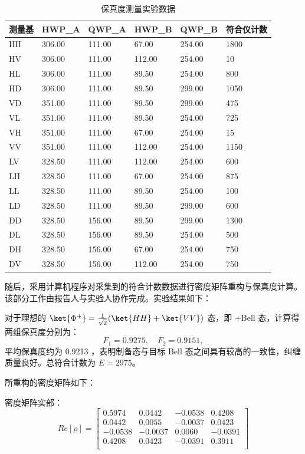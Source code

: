 \begin{table}[h!]
	\centering
	\begin{tabular}{|l|l|l|l|l|l|}
		\hline
		测量基 & HWP\_A & QWP\_A & HWP\_B & QWP\_B & 符合仪计数 \\ \hline
		HH & 306.00 & 111.00 & 67.00 & 254.00 & 1800 \\ \hline
		HV & 306.00 & 111.00 & 112.00 & 254.00 & 10 \\ \hline
		HL & 306.00 & 111.00 & 89.50 & 254.00 & 800 \\ \hline
		HD & 306.00 & 111.00 & 89.50 & 299.00 & 1050 \\ \hline
		VD & 351.00 & 111.00 & 89.50 & 299.00 & 475 \\ \hline
		VL & 351.00 & 111.00 & 89.50 & 254.00 & 725 \\ \hline
		VH & 351.00 & 111.00 & 67.00 & 254.00 & 15 \\ \hline
		VV & 351.00 & 111.00 & 112.00 & 254.00 & 1150 \\ \hline
		LV & 328.50 & 111.00 & 112.00 & 254.00 & 600 \\ \hline
		LH & 328.50 & 111.00 & 67.00 & 254.00 & 875 \\ \hline
		LL & 328.50 & 111.00 & 89.50 & 254.00 & 100 \\ \hline
		LD & 328.50 & 111.00 & 89.50 & 299.00 & 600 \\ \hline
		DD & 328.50 & 156.00 & 89.50 & 299.00 & 1300 \\ \hline
		DL & 328.50 & 156.00 & 89.50 & 254.00 & 500 \\ \hline
		DH & 328.50 & 156.00 & 67.00 & 254.00 & 750 \\ \hline
		DV & 328.50 & 156.00 & 112.00 & 254.00 & 750 \\ \hline
	\end{tabular}
	\caption{保真度测量实验数据}
	\label{tab3}
\end{table}

随后，采用计算机程序对采集到的符合计数数据进行密度矩阵重构与保真度计算。该部分工作由报告人与实验人协作完成。实验结果如下：

对于理想的 $\ket{\Phi^+} = \frac{1}{\sqrt{2}}(\ket{HH} + \ket{VV})$ 态，即 +Bell 态，计算得两组保真度分别为：
\[
F_1 = 0.9275,\quad F_2 = 0.9151,
\]
平均保真度约为 0.9213 ，表明制备态与目标 Bell 态之间具有较高的一致性，纠缠质量良好。总符合计数为 $E = 2975$。

所重构的密度矩阵如下：

密度矩阵实部：
\[
Re[\rho]=\begin{bmatrix}
	0.5974 & 0.0442 & -0.0538 & 0.4208 \\
	0.0442 & 0.0055 & -0.0037 & 0.0423 \\
	-0.0538 & -0.0037 & 0.0060 & -0.0391 \\
	0.4208 & 0.0423 & -0.0391 & 0.3911 \\
\end{bmatrix}
\]

